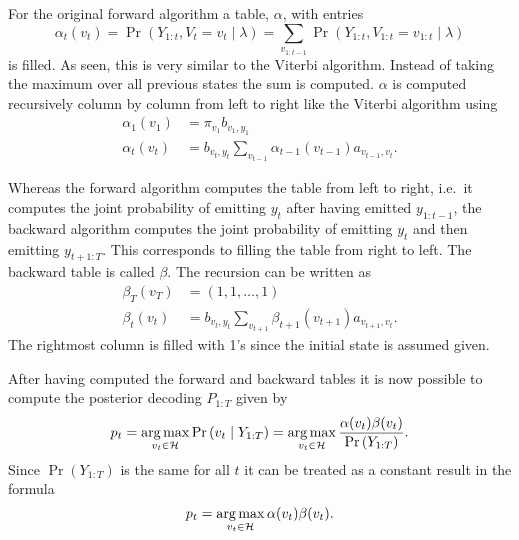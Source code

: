 For the original forward algorithm a table, $\alpha$, with entries
\begin{equation*}
\alpha_t(v_t) = \Pr \left( Y_{1:t}, V_t = v_t \mid \lambda \right) =
\sum_{v_{1:t-1}} \Pr \left( Y_{1:t}, V_{1:t} = v_{1:t} \mid \lambda \right)
\end{equation*}
is filled. As seen, this is very similar to the Viterbi algorithm. Instead of
taking the maximum over all previous states the sum is computed. $\alpha$ is
computed recursively column by column from left to right like the Viterbi
algorithm using
\begin{equation}
  \label{eq:8}
  \begin{aligned}
    \alpha_1(v_1) &= \pi_{v_1} b_{v_1, y_1} \\
    \alpha_t(v_t) &= b_{v_t, y_t} \sum_{v_{t - 1}} \alpha_{t - 1}(v_{t - 1})
    a_{v_{t - 1}, v_t}.
  \end{aligned}
\end{equation}

Whereas the forward algorithm computes the table from left to right, i.e.\
it computes the joint probability of emitting $y_t$ after having emitted
$y_{1:t-1}$, the backward algorithm computes the joint probability of emitting
$y_t$ and then emitting $y_{t+1:T}$. This corresponds to filling the table from
right to left. The backward table is called $\beta$. The recursion can be written as
\begin{equation}
  \label{eq:9}
  \begin{aligned}
    \beta_T(v_T) &= (1, 1, \dots, 1) \\
    \beta_t(v_t) &= b_{v_t, y_t} \sum_{v_{t + 1}} \beta_{t + 1}(v_{t + 1})
    a_{v_{t + 1}, v_t}.
  \end{aligned}
\end{equation}
The rightmost column is filled with 1's since the initial state is assumed
given.

After having computed the forward and backward tables it is now possible to
compute the posterior decoding $P_{1:T}$ given by
\begin{equation*}
  p_t = \operatorname*{arg\,max}_{v_t \in \mathcal{H}} \Pr \left(v_t \mid Y_{1:T} \right) =
  \operatorname*{arg\,max}_{v_t \in \mathcal{H}} \frac{\alpha(v_t) \beta(v_t)}{\Pr \left( Y_{1:T} \right)}.
\end{equation*}
Since $\Pr ( Y_{1:T} )$ is the same for all $t$ it can be treated as
a constant result in the formula
\begin{equation}
  \label{eq:6}
  p_t = \operatorname*{arg\,max}_{v_t \in \mathcal{H}} \alpha(v_t) \beta(v_t).
\end{equation}

